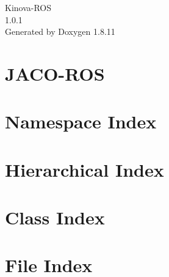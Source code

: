 \documentclass[twoside]{book}
\newcommand{\+}{\discretionary{\mbox{\scriptsize$\hookleftarrow$}}{}{}}
\newcommand{\clearemptydoublepage}{%
  \newpage{\pagestyle{empty}\cleardoublepage}%
}
\begin{document}
\hypersetup{pageanchor=false,
             bookmarksnumbered=true,
             pdfencoding=unicode
            }
\begin{titlepage}
\vspace*{7cm}
\begin{center}%
{\Large Kinova-\/\+R\+OS \\[1ex]\large 1.\+0.\+1 }\\
\vspace*{1cm}
{\large Generated by Doxygen 1.8.11}\\
\end{center}
\end{titlepage}
\clearemptydoublepage
\tableofcontents
\clearemptydoublepage
{}
\hypersetup{pageanchor=true}

\chapter{J\+A\+C\+O-\/\+R\+OS}
\label{md_D:_Longfei_Desktop_catkin_KinovaROS_src_jaco-ros_README}
\hypertarget{md_D:_Longfei_Desktop_catkin_KinovaROS_src_jaco-ros_README}{}

\chapter{Namespace Index}

\chapter{Hierarchical Index}

\chapter{Class Index}

\chapter{File Index}

\end{document}
